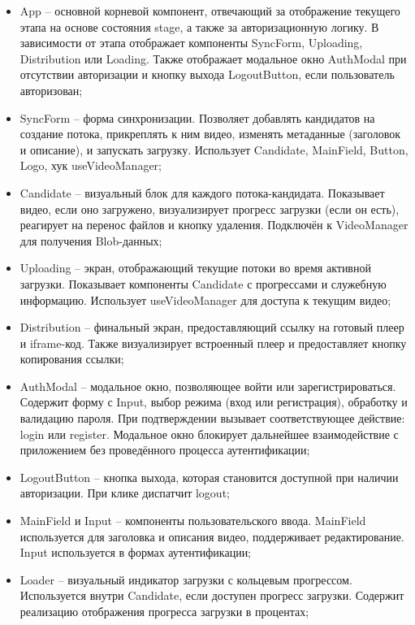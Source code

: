 	\begin{itemize}[label=$\bullet$]
		\item App – основной корневой компонент, отвечающий за отображение текущего этапа на основе состояния stage, а также за авторизационную логику. В зависимости от этапа отображает компоненты SyncForm, Uploading, Distribution или Loading. Также отображает модальное окно AuthModal при отсутствии авторизации и кнопку выхода LogoutButton, если пользователь авторизован;
		\item SyncForm – форма синхронизации. Позволяет добавлять кандидатов на создание потока, прикреплять к ним видео, изменять метаданные (заголовок и описание), и запускать загрузку. Использует Candidate, MainField, Button, Logo, хук useVideoManager;
		\item Candidate – визуальный блок для каждого потока-кандидата. Показывает видео, если оно загружено, визуализирует прогресс загрузки (если он есть), реагирует на перенос файлов и кнопку удаления. Подключён к VideoManager для получения Blob-данных;
		\item Uploading – экран, отображающий текущие потоки во время активной загрузки. Показывает компоненты Candidate с прогрессами и служебную информацию. Использует useVideoManager для доступа к текущим видео;
		\item Distribution – финальный экран, предоставляющий ссылку на готовый плеер и iframe-код. Также визуализирует встроенный плеер и предоставляет кнопку копирования ссылки;
		\item AuthModal – модальное окно, позволяющее войти или зарегистрироваться. Содержит форму с Input, выбор режима (вход или регистрация), обработку и валидацию пароля. При подтверждении вызывает соответствующее действие: login или register. Модальное окно блокирует дальнейшее взаимодействие с приложением без проведённого процесса аутентификации;
		\item LogoutButton – кнопка выхода, которая становится доступной при наличии авторизации. При клике диспатчит logout;
		\item MainField и Input – компоненты пользовательского ввода. MainField используется для заголовка и описания видео, поддерживает редактирование. Input используется в формах аутентификации;
		\item Loader – визуальный индикатор загрузки с кольцевым прогрессом. Используется внутри Candidate, если доступен прогресс загрузки. Содержит реализацию отображения прогресса загрузки в процентах;
	\end{itemize}

